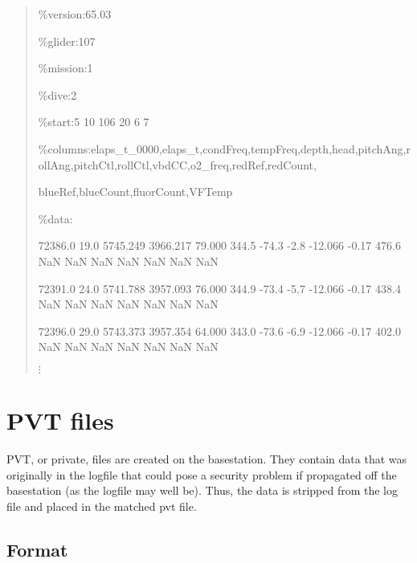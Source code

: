 \documentclass[12pt,english,twoside]{book}
\begin{document}
\begin{quotation}
{\tiny \%version:65.03}{\tiny \par}

{\tiny \%glider:107}{\tiny \par}

{\tiny \%mission:1}{\tiny \par}

{\tiny \%dive:2}{\tiny \par}

{\tiny \%start:5 10 106 20 6 7}{\tiny \par}

{\tiny \%columns:elaps\_t\_0000,elaps\_t,condFreq,tempFreq,depth,head,pitchAng,rollAng,pitchCtl,rollCtl,vbdCC,o2\_freq,redRef,redCount,}{\tiny \par}

{\tiny blueRef,blueCount,fluorCount,VFTemp}{\tiny \par}

{\tiny \%data: }{\tiny \par}

{\tiny 72386.0 19.0 5745.249 3966.217 79.000 344.5 -74.3 -2.8 -12.066
-0.17 476.6 NaN NaN NaN NaN NaN NaN NaN }{\tiny \par}

{\tiny 72391.0 24.0 5741.788 3957.093 76.000 344.9 -73.4 -5.7 -12.066
-0.17 438.4 NaN NaN NaN NaN NaN NaN NaN }{\tiny \par}

{\tiny 72396.0 29.0 5743.373 3957.354 64.000 343.0 -73.6 -6.9 -12.066
-0.17 402.0 NaN NaN NaN NaN NaN NaN NaN }{\tiny \par}

{\tiny $\vdots$}{\tiny \par}
\end{quotation}

\section{PVT files}

PVT, or private, files are created on the basestation. They contain
data that was originally in the logfile that could pose a security
problem if propagated off the basestation (as the logfile may well
be). Thus, the data is stripped from the log file and placed in the
matched pvt file.


\subsection{Format}
\end{document}
